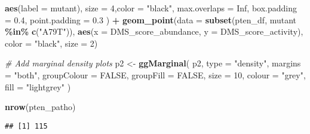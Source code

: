 \documentclass[
]{article}
\newenvironment{Shaded}{\begin{snugshade}}{\end{snugshade}}
\newcommand{\AttributeTok}[1]{\textcolor[rgb]{0.13,0.29,0.53}{#1}}
\newcommand{\CommentTok}[1]{\textcolor[rgb]{0.56,0.35,0.01}{\textit{#1}}}
\newcommand{\ConstantTok}[1]{\textcolor[rgb]{0.56,0.35,0.01}{#1}}
\newcommand{\DecValTok}[1]{\textcolor[rgb]{0.00,0.00,0.81}{#1}}
\newcommand{\FloatTok}[1]{\textcolor[rgb]{0.00,0.00,0.81}{#1}}
\newcommand{\FunctionTok}[1]{\textcolor[rgb]{0.13,0.29,0.53}{\textbf{#1}}}
\newcommand{\NormalTok}[1]{#1}
\newcommand{\OtherTok}[1]{\textcolor[rgb]{0.56,0.35,0.01}{#1}}
\newcommand{\SpecialCharTok}[1]{\textcolor[rgb]{0.81,0.36,0.00}{\textbf{#1}}}
\newcommand{\StringTok}[1]{\textcolor[rgb]{0.31,0.60,0.02}{#1}}
\begin{document}
\begin{Shaded}
\begin{Highlighting}[]
                  \FunctionTok{aes}\NormalTok{(}\AttributeTok{label =}\NormalTok{ mutant),}
                  \AttributeTok{size =} \DecValTok{4}\NormalTok{,}\AttributeTok{color =} \StringTok{"black"}\NormalTok{,}
                  \AttributeTok{max.overlaps =} \ConstantTok{Inf}\NormalTok{, }\AttributeTok{box.padding =} \FloatTok{0.4}\NormalTok{, }\AttributeTok{point.padding =} \FloatTok{0.3}
\NormalTok{  ) }\SpecialCharTok{+}
  \FunctionTok{geom\_point}\NormalTok{(}\AttributeTok{data =} \FunctionTok{subset}\NormalTok{(pten\_df, mutant }\SpecialCharTok{\%in\%} \FunctionTok{c}\NormalTok{(}\StringTok{"A79T"}\NormalTok{)),}
             \FunctionTok{aes}\NormalTok{(}\AttributeTok{x =}\NormalTok{ DMS\_score\_abundance, }\AttributeTok{y =}\NormalTok{ DMS\_score\_activity),}
             \AttributeTok{color =} \StringTok{"black"}\NormalTok{, }\AttributeTok{size =} \DecValTok{2}\NormalTok{) }

\CommentTok{\# Add marginal density plots}
\NormalTok{p2 }\OtherTok{\textless{}{-}} \FunctionTok{ggMarginal}\NormalTok{(}
\NormalTok{  p2,}
  \AttributeTok{type =} \StringTok{"density"}\NormalTok{,}
  \AttributeTok{margins =} \StringTok{"both"}\NormalTok{,}
  \AttributeTok{groupColour =} \ConstantTok{FALSE}\NormalTok{,}
  \AttributeTok{groupFill =} \ConstantTok{FALSE}\NormalTok{,}
  \AttributeTok{size =} \DecValTok{10}\NormalTok{,}
  \AttributeTok{colour =} \StringTok{"grey"}\NormalTok{,}
  \AttributeTok{fill =} \StringTok{"lightgrey"}
\NormalTok{)}


\FunctionTok{nrow}\NormalTok{(pten\_patho)}
\end{Highlighting}
\end{Shaded}

\begin{verbatim}
## [1] 115
\end{verbatim}
\end{document}
